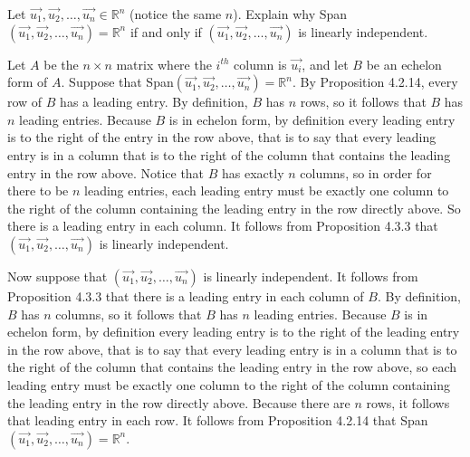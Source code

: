 \documentclass[12pt]{article}
\newenvironment{problem}[2][Problem]
{
	\begin{trivlist} 
		\item[\hskip \labelsep {\bfseries #1 #2:}]
	}
{
	\end{trivlist}
	}
\newenvironment{solution}[1][Solution]
{
	\begin{trivlist} 
		\item[\hskip \labelsep {\itshape #1:}]
	}
	{
	\end{trivlist}
}
\begin{document}
\newpage
\begin{problem}{6}
Let $\vec{u_1},\vec{u_2}, \dots , \vec{u_n} \in \mathbb{R}^n$ (notice the same $n$). Explain why Span$(\vec{u_1},\vec{u_2}, \dots ,\vec{u_n}) =\mathbb{R}^n$ if and only if $(\vec{u_1},\vec{u_2}, \dots , \vec{u_n})$ is linearly independent.
\noindent
\newline
\newline
\begin{solution}
Let $A$ be the $n \times n$ matrix where the $i^{th}$ column is $\vec{u_i}$, and let $B$ be an echelon form of $A$. Suppose that Span$(\vec{u_1},\vec{u_2}, \dots ,\vec{u_n}) =\mathbb{R}^n$. By Proposition 4.2.14, every row of $B$ has a leading entry. By definition, $B$ has $n$ rows, so it follows that $B$ has $n$ leading entries. Because $B$ is in echelon form, by definition every leading entry is to the right of the entry in the row above, that is to say that every leading entry is in a column that is to the right of the column that contains the leading entry in the row above. Notice that $B$ has exactly $n$ columns, so in order for there to be $n$ leading entries, each leading entry must be exactly one column to the right of the column containing the leading entry in the row directly above. So there is a leading entry in each column. It follows from Proposition 4.3.3 that $(\vec{u_1},\vec{u_2}, \dots ,\vec{u_n})$ is linearly independent.

Now suppose that $(\vec{u_1},\vec{u_2}, \dots ,\vec{u_n})$ is linearly independent. It follows from Proposition 4.3.3 that there is a leading entry in each column of $B$. By definition, $B$ has $n$ columns, so it follows that $B$ has $n$ leading entries. Because $B$ is in echelon form, by definition every leading entry is to the right of the leading entry in the row above, that is to say that every leading entry is in a column that is to the right of the column that contains the leading entry in the row above, so each leading entry must be exactly one column to the right of the column containing the leading entry in the row directly above. Because there are $n$ rows, it follows that leading entry in each row. It follows from Proposition 4.2.14 that Span$(\vec{u_1},\vec{u_2}, \dots ,\vec{u_n}) =\mathbb{R}^n$.


\end{solution}
\end{problem}
\end{document}
